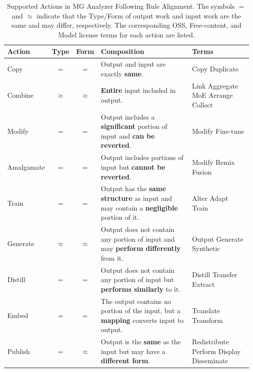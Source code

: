\begin{table}[h]
    \caption{Supported Actions in MG Analyzer Following Rule Alignment. The symbols $=$ and $\approx$ indicate that the Type/Form of output work and input work are the same and may differ, respectively. The corresponding \textcolor{Construct}{OSS}, \textcolor{Ruling}{Free-content}, and \textcolor{Request}{Model} license terms for each action are listed. }
    \tiny
    \label{tab:action}
    \begin{tabular}{|l|c|c|p{3.4cm}|p{1.5cm}|}
    \hline
    \rowcolor[gray]{.8}
    Action & Type & Form & Composition & Terms \\ \hline

    Copy & $=$ & $=$ & Output and input are exactly \textbf{same}. & Copy Duplicate \\ \hline

    Combine & $\approx$ & $\approx$ & \textbf{Entire} input included in output. & \textcolor{Construct}{Link} \textcolor{Construct}{Aggregate} \textcolor{Request}{MoE} \textcolor{Ruling}{Arrange} \textcolor{Ruling}{Collect} \\ \hline

    Modify & $=$ & $=$ & Output includes a \textbf{significant} portion of input and \textbf{can be reverted}. & Modify \textcolor{Request}{Fine-tune}   \\ \hline

    Amalgamate & $=$ & $=$ & Output includes portions of input but \textbf{cannot be reverted}. & Modify \textcolor{Ruling}{Remix} \textcolor{Request}{Fusion} \\ \hline

    Train & $=$ & $=$ & Output has the \textbf{same structure} as input and may contain a \textbf{negligible} portion of it. & \textcolor{Ruling}{Alter Adapt} \textcolor{Request}{Train} \\ \hline

    Generate & $\approx$ & $\approx$ & Output does not contain any portion of input and may \textbf{perform differently} from it. & Output \textcolor{Request}{Generate} \newline \textcolor{Request}{Synthetic} \\ \hline

    Distill & $=$ & $=$ & Output does not contain any portion of input but \textbf{performs similarly} to it. & \textcolor{Request}{Distill Transfer} \newline \textcolor{Ruling}{Extract} \\ \hline

    Embed & $=$ & $=$ & The output contains no portion of the input, but a \textbf{mapping} converts input to output. & \textcolor{Ruling}{Translate Transform} \\ \hline

    Publish & $=$ & $\approx$ & Output is the \textbf{same} as the input but may have a \textbf{different form}.  & \textcolor{Construct}{Redistribute} \textcolor{Ruling}{Perform Display Disseminate} \\ \hline
    \end{tabular}
\end{table} 


